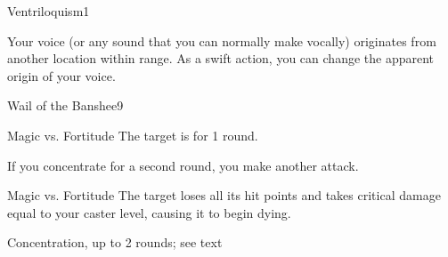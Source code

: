 \begin{spellsection}{Ventriloquism}{1}
\begin{spellheader}
    \spellrng{\rngmed}
    \begin{spelltargetinginfo}
    \end{spelltargetinginfo}
\end{spellheader}
\begin{spellcontent}
    \begin{spelleffects}
        \spelleffect Your voice (or any sound that you can normally make vocally) originates from another location within range. As a swift action, you can change the apparent origin of your voice.
        \spelldur \durshort \dismissable
    \end{spelleffects}
\end{spellcontent}
\begin{spellfooter}
\end{spellfooter}
\end{spellsection}

\begin{spellsection}{Wail of the Banshee}{9}
\begin{spellheader}
    \begin{spelltargetinginfo}
    \end{spelltargetinginfo}
    \begin{spelleffects}
        \begin{spelltargetinginfo}
        \end{spelltargetinginfo}
    \end{spelleffects}
\end{spellheader}
\begin{spellcontent}
    \begin{spellattack}{Magic vs. Fortitude}
        \spellsuccess The target is \staggered for 1 round.
    \end{spellattack}
    \spellspecial If you concentrate for a second round, you make another attack.
    \begin{spellattack}{Magic vs. Fortitude}
        \spellsuccess The target loses all its hit points and takes critical damage equal to your caster level, causing it to begin dying.
    \end{spellattack}
    \spelldur Concentration, up to 2 rounds; see text
\end{spellcontent}
\begin{spellfooter}
\end{spellfooter}
\end{spellsection}

